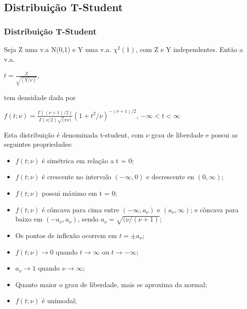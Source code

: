 \subsection{Distribuição T-Student}
\begin{frame}
\frametitle{Distribuição T-Student}

Seja Z uma v.a  N(0,1) e Y uma v.a. $\chi^2(1)$, com Z e Y independentes. Então a v.a. 

\begin{center}$t=\displaystyle\frac{Z}{\sqrt{(Y/\nu)}}$,\end{center}

tem densidade dada por

 \begin{center}$f(t;\nu) = \displaystyle\frac{\Gamma ((\nu+1)/2)}{\Gamma(\nu/2)\sqrt(\pi \nu)} (1+t^2/\nu)^{-(\nu+1)/2}$, $-\infty < t < \infty$\end{center}

Esta distribuição é denominada t-student, com $\nu$ grau de liberdade e possui as seguintes propriedades:

\begin{itemize}
  \item $f(t;\nu)$ é simétrica em relação a t = 0;
  \item $f(t;\nu)$ é crescente no intervalo $( -\infty, 0)$ e decrescente en $(0, \infty)$;
  \item $f(t;\nu)$ possui máximo em t = 0;
  \item $f(t;\nu)$ é côncava para cima entre $(-\infty, a_{\nu})$ e $(a_{\nu}, \infty)$; e côncava para baixo em $(-a_{\nu}, a_{\nu})$, sendo $a_{\nu}=\sqrt{(\nu/(\nu+1)}$;
  \item Os pontos de inflexão ocorrem em $t=\pm a_{\nu}$;
  \item $f(t;\nu) \rightarrow 0$ quando $t \rightarrow\infty$ ou $t \rightarrow-\infty$;
  \item $a_{\nu}\rightarrow 1$ quando $\nu\rightarrow \infty$;
  \item Quanto maior o grau de liberdade, mais se aproxima da normal;
  \item $f(t;\nu)$ é unimodal;
\end{itemize}

\end{frame}


